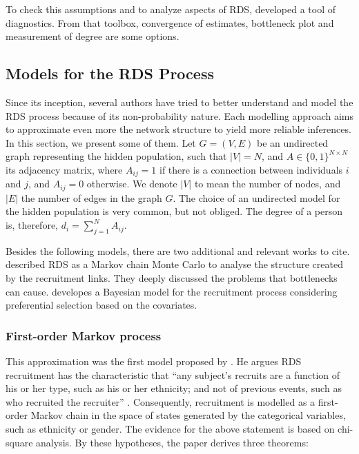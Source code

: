To check this assumptions and to analyze aspects of RDS,
\textcite{gile2015diagnostics} developed a tool of diagnostics. From
that toolbox, convergence of estimates, bottleneck plot and measurement of
degree are some options. 

\subsection{Models for the RDS Process}
\label{sec:models-rds-process}

Since its inception, several authors have tried to better understand and model
the RDS process because of its non-probability nature. Each modelling approach
aims to approximate even more the network structure to yield more reliable
inferences. In this section, we present some of them. Let $G = (V,E)$ be an
undirected graph representing the hidden population, such that $|V| = N$, and
$A \in \{0,1\}^{N \times N}$ its adjacency matrix, where $A_{ij} = 1$ if there
is a connection between individuals $i$ and $j$, and $A_{ij} = 0$ otherwise.
We denote $|V|$ to mean the number of nodes, and $|E|$ the number of edges in
the graph $G$. The choice of an undirected model for the hidden population is very common,
but not obliged. The degree of a person is, therefore, $d_i = \sum_{j=1}^N
A_{ij}$.

Besides the following models, there are two additional and relevant works  to
cite. \textcite{goel2009respondent} described RDS as a Markov chain Monte
Carlo to analyse the structure created by the recruitment links. They deeply
discussed the problems that bottlenecks can cause.
\textcite{mclaughlin2021bayesian} developes a Bayesian model for the
recruitment process considering preferential selection based on the covariates.


\subsubsection{First-order Markov process}
\label{sec:first-order-markov-process}

This approximation was the first model proposed by \textcite{heckathorn1997}. 
He argues RDS recruitment has the characteristic that ``any subject's recruits are
a function of his or her type, such as his or her ethnicity; and not of
previous events, such as who recruited the recruiter'' \cite[p. 182]{heckathorn1997}. Consequently, 
recruitment is modelled as a first-order Markov chain in the space of states
generated by the categorical variables, such as ethnicity or gender. The
evidence for the above statement is based on chi-square analysis. By these
hypotheses, the paper derives three theorems: 

